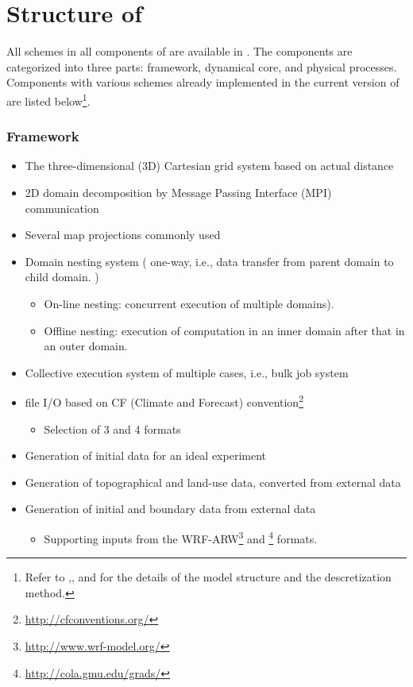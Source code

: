\section{Structure of \scalerm}  \label{subsec:sturcture_scale_rm}
All schemes in all components of \scalelib are available in \scalerm.
The components are categorized into three parts:
framework, dynamical core, and physical processes.
Components with various schemes already implemented
in the current version of \scalerm are listed below\footnote{Refer to \citet{scale_2015},\citet{satoy_2015b}, and \citet{nishizawa_2015} for the details of the model structure and the descretization method.}.

\subsubsection{Framework}
\begin{itemize}
 \item The three-dimensional (3D) Cartesian grid system based on actual distance
 \item 2D domain decomposition by Message Passing Interface (MPI) communication
 \item Several map projections commonly used
 \item Domain nesting system ( one-way, i.e., data transfer from parent domain to child domain. )
   \begin{itemize}
    \item  On-line nesting: concurrent execution of multiple domains).
    \item  Offline nesting: execution of computation in an inner domain after that in an outer domain.
   \end{itemize}
 \item Collective execution system of multiple cases, i.e., bulk job system
 \item \netcdf file I/O based on CF (Climate and Forecast) convention\footnote{\url{http://cfconventions.org/}}
   \begin{itemize}
   \item Selection of {\netcdf}3 and {\netcdf}4 formats
   \end{itemize}
 \item Generation of initial data for an ideal experiment
 \item Generation of topographical and land-use data, converted from external data
 \item Generation of initial and boundary data from external data
   \begin{itemize}
    \item 
      Supporting inputs from the WRF-ARW\footnote{\url{http://www.wrf-model.org/}} and
      \grads \footnote{\url{http://cola.gmu.edu/grads/}} formats.
   \end{itemize}
\end{itemize}

